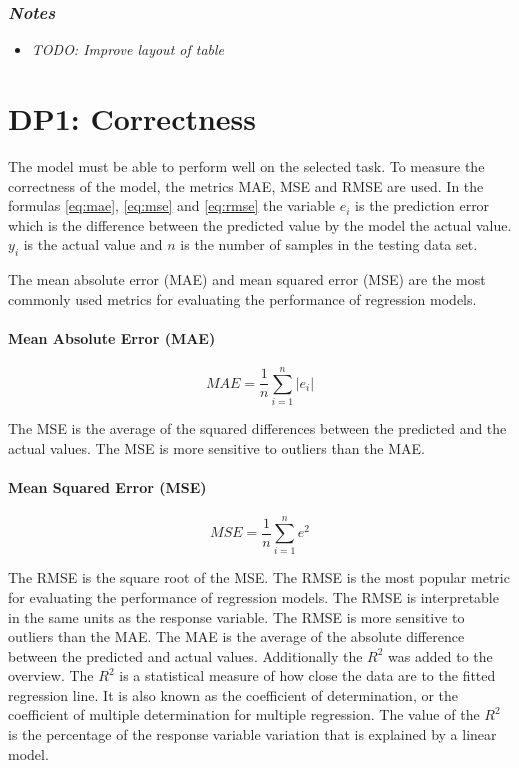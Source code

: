 \subsubsection*{\textit{Notes}}

\begin{itemize}
    \item \textit{TODO: Improve layout of table}
\end{itemize}


\section{DP1: Correctness}\label{sec:dp2:-correctness}
The model must be able to perform well on the selected task.
To measure the correctness of the model, the metrics MAE, MSE and RMSE are used.
In the formulas \ref{eq:mae}, \ref{eq:mse} and \ref{eq:rmse} the variable $e_i$ is the prediction
error which is the difference between the predicted value by the model the actual value.
$y_i$ is the actual value and $n$ is the number of samples in the testing data set.

The mean absolute error (MAE) and mean squared error (MSE) are the most commonly used metrics for
evaluating the performance of regression models. \paragraph*{Mean Absolute Error (MAE)}

\begin{equation}
    \label{eq:mae}
    MAE = \frac{1}{n} \sum_{i=1}^{n} |e_i|
\end{equation}

The MSE is the average of the squared differences between the predicted and the actual values.
The MSE is more sensitive to outliers than the MAE.

\paragraph*{Mean Squared Error (MSE)}

\begin{equation}
    \label{eq:mse}
    MSE = \frac{1}{n} \sum_{i=1}^{n} e^2
\end{equation}

The RMSE is the square root of the MSE. The RMSE is the most popular metric for evaluating the
performance of regression models. The RMSE is interpretable in the same units as the response
variable. The RMSE is more sensitive to outliers than the MAE.
The MAE is the average of the absolute difference between the predicted and actual values.
Additionally the $R^2$ was added to the overview. The $R^2$ is a statistical measure of how close
the data are to the fitted regression line. It is also known as the coefficient of determination,
or the coefficient of multiple determination for multiple regression. The value of the $R^2$ is
the percentage of the response variable variation that is explained by a linear model.

